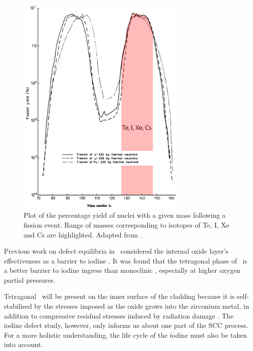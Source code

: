 \begin{figure}[ht] %
    \centering
    \includegraphics[height=11cm]{images/fissionyield.png}
    \caption[Plot of the percentage yield of nuclei with a given mass following a fission event. Range of masses corresponding to isotopes of Te, I, Xe and Cs are highlighted.]{Plot of the percentage yield of nuclei with a given mass following a fission event. Range of masses corresponding to isotopes of Te, I, Xe and Cs are highlighted. Adapted from \cite{England1992}.}
    \label{fig:fissionyield}
\end{figure}

Previous work on defect equilibria in \zirconia\ considered the internal oxide layer's effectiveness as a barrier to iodine \cite{kenichiodine2018}. It was found that the tetragonal phase of \zirconia\ is a better barrier to iodine ingress than monoclinic \zirconia , especially at higher oxygen partial pressures. 

Tetragonal \zirconia\ will be present on the inner surface of the cladding because it is self-stabilised by the stresses imposed as the oxide grows into the zirconium metal, in addition to compressive residual stresses induced by radiation damage \cite{causey2005review}. The iodine defect study, however, only informs us about one part of the SCC process. For a more holistic understanding, the life cycle of the iodine must also be taken into account.    


